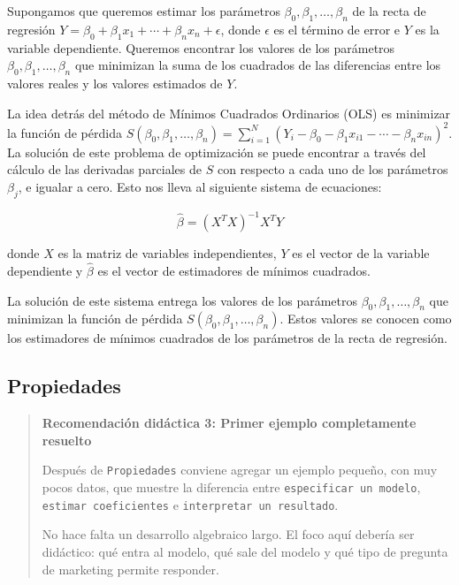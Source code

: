\documentclass[
]{book}
\begin{document}
Supongamos que queremos estimar los parámetros
\(\beta_0, \beta_1, \ldots, \beta_n\) de la recta de regresión
\(Y = \beta_0 + \beta_1 x_1 + \cdots + \beta_n x_n + \epsilon\), donde
\(\epsilon\) es el término de error e \(Y\) es la variable dependiente.
Queremos encontrar los valores de los parámetros
\(\beta_0, \beta_1, \ldots, \beta_n\) que minimizan la suma de los
cuadrados de las diferencias entre los valores reales y los valores
estimados de \(Y\).

La idea detrás del método de Mínimos Cuadrados Ordinarios (OLS) es
minimizar la función de pérdida
\(S(\beta_0, \beta_1, \ldots, \beta_n) = \sum_{i=1}^N (Y_i - \beta_0 - \beta_1 x_{i1} - \cdots - \beta_n x_{in})^2\).
La solución de este problema de optimización se puede encontrar a través
del cálculo de las derivadas parciales de \(S\) con respecto a cada uno de
los parámetros \(\beta_j\), e igualar a cero. Esto nos lleva al siguiente
sistema de ecuaciones:

\[\hat{\beta}=(X^TX)^{-1}X^TY\]

donde \(X\) es la matriz de variables independientes, \(Y\) es el vector de
la variable dependiente y \(\hat{\beta}\) es el vector de estimadores de
mínimos cuadrados.

La solución de este sistema entrega los valores de los parámetros
\(\beta_0, \beta_1, \ldots, \beta_n\) que minimizan la función de pérdida
\(S(\beta_0, \beta_1, \ldots, \beta_n)\). Estos valores se conocen como
los estimadores de mínimos cuadrados de los parámetros de la recta de
regresión.

\hypertarget{propiedades-1}{%
\subsection{Propiedades}\label{propiedades-1}}

\begin{quote}
\textbf{Recomendación didáctica 3: Primer ejemplo completamente resuelto}

Después de \texttt{Propiedades} conviene agregar un ejemplo pequeño, con muy
pocos datos, que muestre la diferencia entre \texttt{especificar\ un\ modelo},
\texttt{estimar\ coeficientes} e \texttt{interpretar\ un\ resultado}.

No hace falta un desarrollo algebraico largo. El foco aquí debería ser
didáctico: qué entra al modelo, qué sale del modelo y qué tipo de
pregunta de marketing permite responder.
\end{quote}
\end{document}
